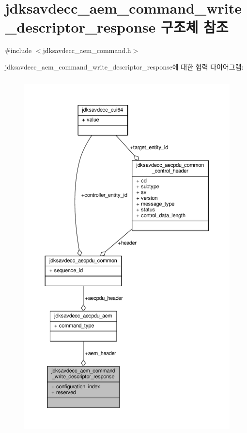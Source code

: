 \hypertarget{structjdksavdecc__aem__command__write__descriptor__response}{}\section{jdksavdecc\+\_\+aem\+\_\+command\+\_\+write\+\_\+descriptor\+\_\+response 구조체 참조}
\label{structjdksavdecc__aem__command__write__descriptor__response}


{\ttfamily \#include $<$jdksavdecc\+\_\+aem\+\_\+command.\+h$>$}



jdksavdecc\+\_\+aem\+\_\+command\+\_\+write\+\_\+descriptor\+\_\+response에 대한 협력 다이어그램\+:
\nopagebreak
\begin{figure}[H]
\begin{center}
\leavevmode
\includegraphics[height=550pt]{structjdksavdecc__aem__command__write__descriptor__response__coll__graph}
\end{center}
\end{figure}
